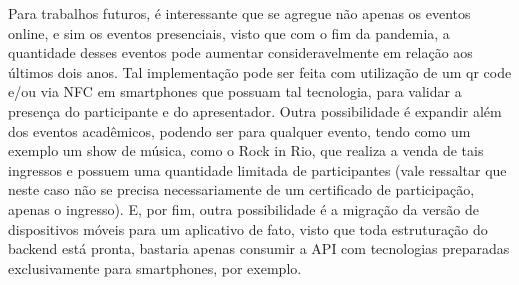 Para trabalhos futuros, é interessante que se agregue não apenas os eventos online, e sim os eventos presenciais, visto que com o fim da pandemia, a quantidade desses eventos pode aumentar consideravelmente em relação aos últimos dois anos. Tal implementação pode ser feita com utilização de um qr code e/ou via NFC em smartphones que possuam tal tecnologia, para validar a presença do participante e do apresentador. Outra possibilidade é expandir além dos eventos acadêmicos, podendo ser para qualquer evento, tendo como um exemplo um show de música, como o Rock in Rio, que realiza a venda de tais ingressos e possuem uma quantidade limitada de participantes (vale ressaltar que neste caso não se precisa necessariamente de um certificado de participação, apenas o ingresso). E, por fim, outra possibilidade é a migração da versão de dispositivos móveis para um aplicativo de fato, visto que toda estruturação do backend está pronta, bastaria apenas consumir a API com tecnologias preparadas exclusivamente para smartphones, por exemplo.